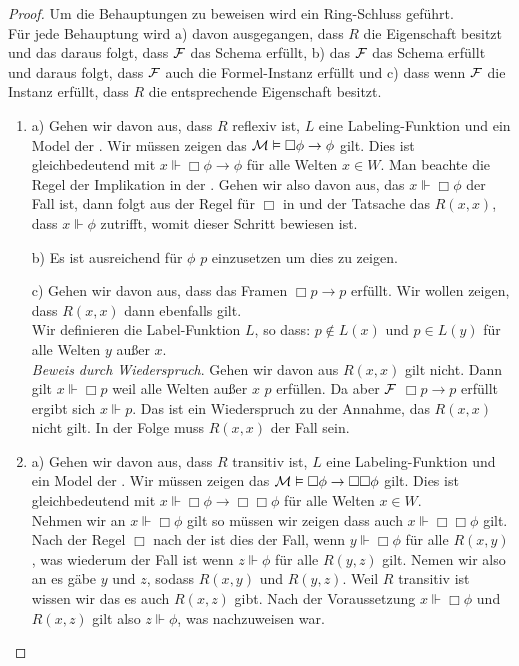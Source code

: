 \begin{proof}
	Um die Behauptungen zu beweisen wird ein Ring-Schluss geführt.\\
	Für jede Behauptung wird a) davon ausgegangen, dass $R$ die Eigenschaft besitzt und das daraus folgt, dass $\mathcal{F}$ das Schema erfüllt, b) das $\mathcal{F}$ das Schema erfüllt und daraus folgt, dass $\mathcal{F}$ auch die Formel-Instanz erfüllt und c) dass wenn $\mathcal{F}$ die Instanz erfüllt, dass $R$ die entsprechende Eigenschaft besitzt.
	
	\begin{enumerate}
		\item a) Gehen wir davon aus, dass $R$ reflexiv ist, $L$ eine Labeling-Funktion und \ModelDef ein Model der \NML. 
		Wir müssen zeigen das $\mathcal{M} \vDash \Box\phi \rightarrow \phi$ gilt. 
		Dies ist gleichbedeutend mit $x \Vdash \Box \phi \rightarrow \phi$ für alle Welten $x \in W$.
		Man beachte die Regel der Implikation in der .
		Gehen wir also davon aus, das $x \Vdash \Box \phi$ der Fall ist, dann folgt aus der Regel für $\Box$ in  und der Tatsache das $R(x,x)$, dass $x \Vdash \phi$ zutrifft, womit dieser Schritt bewiesen ist.
		
		b) Es ist ausreichend für $\phi$ $p$ einzusetzen um dies zu zeigen.
		
		c) Gehen wir davon aus, dass das Framen $\Box p \rightarrow p$ erfüllt.
		Wir wollen zeigen, dass $R(x,x)$ dann ebenfalls gilt.\\
		Wir definieren die Label-Funktion $L$, so dass: $p \notin L(x)$ und $p \in L(y)$ für alle Welten $y$ außer $x$.\\
		\emph{Beweis durch Wiederspruch}. Gehen wir davon aus $R(x,x)$ gilt nicht.
		Dann gilt $x \Vdash \Box p$ weil alle Welten außer $x$ $p$ erfüllen.
		Da aber $\mathcal{F}$ $\Box p \rightarrow p$ erfüllt ergibt sich $x \Vdash p$.
		Das ist ein Wiederspruch zu der Annahme, das $R(x,x)$ nicht gilt.
		In der Folge muss $R(x,x)$ der Fall sein.
		
		\item a) Gehen wir davon aus, dass $R$ transitiv ist, $L$ eine Labeling-Funktion und \ModelDef ein Model der \NML. 
		Wir müssen zeigen das $\mathcal{M} \vDash \Box \phi \rightarrow \Box \Box \phi$ gilt. 
		Dies ist gleichbedeutend mit $x \Vdash \Box \phi \rightarrow \Box \Box \phi$ für alle Welten $x \in W$.\\
		Nehmen wir an $x \Vdash \Box \phi$ gilt so müssen wir zeigen dass auch $x \Vdash \Box \Box \phi$ gilt. 
		Nach der Regel $\Box$ nach der  ist dies der Fall, wenn $y \Vdash \Box \phi$ für alle $R(x,y)$, was wiederum der Fall ist wenn $z \Vdash \phi$ für alle $R(y,z)$ gilt.
		Nemen wir also an es gäbe $y$ und $z$, sodass $R(x,y)$ und $R(y,z)$.
		Weil $R$ transitiv ist wissen wir das es auch $R(x,z)$ gibt.
		Nach der Voraussetzung $x \Vdash \Box \phi$ und $R(x,z)$ gilt also $z \Vdash \phi$, was nachzuweisen war.
		

\end{enumerate}
\end{proof}
